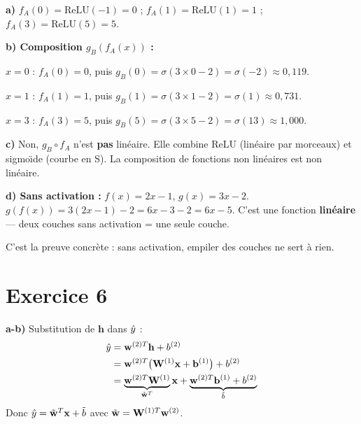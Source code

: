 \separateur

\textbf{a)} $f_A(0) = \text{ReLU}(-1) = \boxed{0}$ \;;\;
$f_A(1) = \text{ReLU}(1) = \boxed{1}$ \;;\;
$f_A(3) = \text{ReLU}(5) = \boxed{5}$.

\textbf{b) Composition $g_B(f_A(x))$ :}

$x = 0$ : $f_A(0) = 0$, puis $g_B(0) = \sigma(3 \times 0 - 2) = \sigma(-2) \approx \boxed{0{,}119}$.

$x = 1$ : $f_A(1) = 1$, puis $g_B(1) = \sigma(3 \times 1 - 2) = \sigma(1) \approx \boxed{0{,}731}$.

$x = 3$ : $f_A(3) = 5$, puis $g_B(5) = \sigma(3 \times 5 - 2) = \sigma(13) \approx \boxed{1{,}000}$.

\textbf{c)} Non, $g_B \circ f_A$ n'est \textbf{pas} lin\'{e}aire.
Elle combine ReLU (lin\'{e}aire par morceaux) et sigmo\"{\i}de (courbe en S).
La composition de fonctions non lin\'{e}aires est non lin\'{e}aire.

\textbf{d) Sans activation :} $f(x) = 2x - 1$, $g(x) = 3x - 2$.
$g(f(x)) = 3(2x - 1) - 2 = 6x - 3 - 2 = \boxed{6x - 5}$.
C'est une fonction \textbf{lin\'{e}aire} --- deux couches sans activation = une seule couche.

\begin{retenirbox}
    C'est la preuve concr\`{e}te : sans activation, empiler des couches ne sert \`{a} rien.
\end{retenirbox}

\section*{Exercice 6 \hfill \exointermediaire}

\separateur

\textbf{a-b)} Substitution de $\mathbf{h}$ dans $\hat{y}$ :
\begin{align*}
    \hat{y} &= \mathbf{w}^{(2)T}\mathbf{h} + b^{(2)} \\
          &= \mathbf{w}^{(2)T}\bigl(\mathbf{W}^{(1)}\mathbf{x} + \mathbf{b}^{(1)}\bigr) + b^{(2)} \\
          &= \underbrace{\mathbf{w}^{(2)T}\mathbf{W}^{(1)}}_{\tilde{\mathbf{w}}^T}\mathbf{x}
             + \underbrace{\mathbf{w}^{(2)T}\mathbf{b}^{(1)} + b^{(2)}}_{\tilde{b}}
\end{align*}
Donc $\hat{y} = \tilde{\mathbf{w}}^T \mathbf{x} + \tilde{b}$ avec $\tilde{\mathbf{w}} = \mathbf{W}^{(1)T}\mathbf{w}^{(2)}$.

